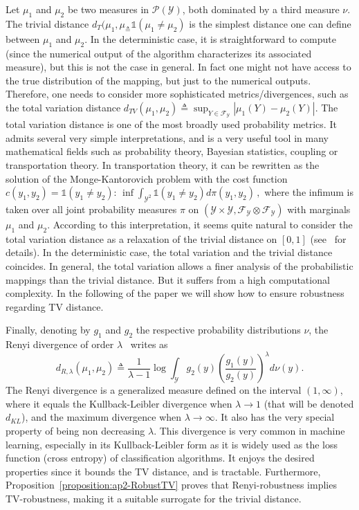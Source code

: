 Let  $\mu_1$ and $\mu_2$ be two measures in $\mathcal{P}(\mathcal{Y})$, both dominated by a third measure $\nu$.
The trivial distance $ d_{T}(\mu_1,\mu_ \triangleq \mathds{1}\left(\mu_1 \neq \mu_2\right)$ is the simplest distance one can define between $\mu_1$ and $\mu_2$.
In the deterministic case, it is straightforward to compute (since the numerical output of the algorithm characterizes its associated measure), but this is not the case in general.
In fact one might not have access to the true distribution of the mapping, but just to the numerical outputs.
Therefore, one needs to consider more sophisticated metrics/divergences, such as the total variation distance $d_{TV}(\mu_1,\mu_2) \triangleq \sup_{Y \in \mathcal{F}_{\mathcal{Y}}} |\mu_1 (Y) - \mu_2(Y)|$.
The total variation distance is one of the most broadly used probability metrics.
It admits several very simple interpretations, and is a very useful tool in many mathematical fields such as probability theory, Bayesian statistics, coupling or transportation theory.
In transportation theory, it can be rewritten as the solution of the Monge-Kantorovich problem with the cost function $c(y_1,y_2) =\mathds{1}\left(y_1 \neq y_2\right)$: $ \inf\int_{\mathcal{Y}^{2}}\mathds{1}\left(y_1 \neq y_2\right) d\pi(y_1,y_2)\, ,$ where the infimum is taken over all joint probability measures $\pi$ on $(\mathcal{Y}\times \mathcal{Y}, \mathcal{F}_{\mathcal{Y} } \otimes \mathcal{F}_{\mathcal{Y}})$ with marginals $\mu_1$ and $\mu_2$.
According to this interpretation, it seems quite natural to consider the total variation distance as a relaxation of the trivial distance on $[0,1]$ (see~\cite{villani2008optimal} for details).
In the deterministic case, the total variation and the trivial distance coincides.
In general, the total variation allows a finer analysis of the probabilistic mappings than the trivial distance.
But it suffers from a high computational complexity.
In the following of the paper we will show how to ensure robustness regarding TV distance.

Finally, denoting by $g_1$ and $g_2$ the respective probability distributions \wrt $\nu$, the Renyi divergence of order $\lambda$~\cite{renyi1961} writes as  
\begin{equation}
  d_{R,\lambda}(\mu_1,\mu_2) \triangleq \frac{1}{\lambda -1}\log \int_{\mathcal{Y}} g_2(y)  \left(\frac{g_1(y)}{g_2(y)}\right)^{\lambda} d\nu(y).
\end{equation}
The Renyi divergence is a generalized measure defined on the interval $(1,\infty)$, where it equals the Kullback-Leibler divergence when $\lambda \rightarrow 1$ (that will be denoted $d_{KL}$), and the maximum divergence when $\lambda \rightarrow \infty$.
It also has the very special property of being non decreasing \wrt $\lambda$.
This divergence is very common in machine learning, especially in its Kullback-Leibler form as it is widely used as the loss function (cross entropy) of classification algorithms.
It enjoys the desired properties  since it bounds the TV distance, and is tractable.
Furthermore, Proposition~\ref{proposition:ap2-RobustTV} proves that Renyi-robustness implies TV-robustness, making it a suitable surrogate for the trivial distance.

